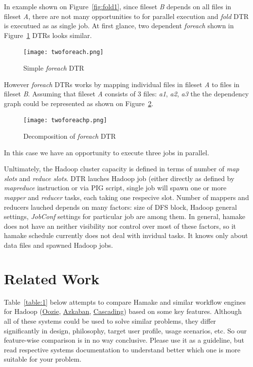 \documentclass{article}
\begin{document}
In example shown on Figure~\ref{fig:fold1}, since fileset \textit{B}
depends on all files in fileset \textit{A}, there are not many
opportunities to for parallel execution and \emph{fold} DTR is
executued as as single job. At first glance, two dependent
\emph{foreach} shown in Figure~\ref{fig:foreach1} DTRs looks similar.

\begin{figure}[htp]
\centering
\texttt{[image: twoforeach.png]}
\caption{Simple \emph{foreach} DTR}
\label{fig:foreach1}
\end{figure}

However \emph{foreach} DTRs works by mapping individual files in
fileset \textit{A} to files in fileset \textit{B}. Assuming that
fileset \textit{A} consists of 3 files: \textit{a1}, \textit{a2},
\textit{a3} the the dependency graph could be represented as shown on
Figure~\ref{fig:foreach2}.

\begin{figure}[htp]
\centering
\texttt{[image: twoforeachp.png]}
\caption{Decomposition of \emph{foreach} DTR}
\label{fig:foreach2}
\end{figure}

In this case we have an opportunity to execute three jobs in parallel.

Unltimately, the Hadoop cluster capacity is defined in terms of number
of \textit{map slots} and \textit{reduce slots}.  DTR lauches Hadoop
job (either directly as defined by \emph{mapreduce} instruction or via
PIG script, single job will spawn one or more \emph{mapper} and
\emph{reducer} tasks, each taking one respecive slot. Number of
mappers and reducers lauched depends on many factors: size of DFS
block, Hadoop general settings, \emph{JobConf} settings for particular
job are among them. In general, hamake does not have an neither
visibility nor control over most of these factors, so it hamake
schedule currently does not deal with invidual tasks. It knows only
about data files and spawned Hadoop jobs.

\section{Related Work}

Table~\ref{table:1} below attempts to compare Hamake and similar
workflow engines for Hadoop
(\href{http://github.com/tucu00/oozie1}{Oozie},
\href{http://sna-projects.com/azkaban/}{Azkaban},
\href{http://www.cascading.org/}{Cascading}) based on some key
features. Although all of these systems could be used to solve similar
problems, they differ significantly in design, philosophy, target user
profile, usage scenarios, etc.  So our feature-wise comparison is in
no way conclusive. Please use it as a guideline, but read respective
systems documentation to understand better which one is more suitable
for your problem.
\end{document}
